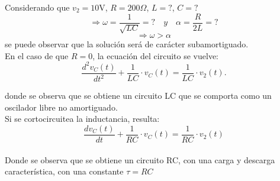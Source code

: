 \documentclass[a4paper]{article}
\begin{document}
Considerando que $v_2 = 10\textrm{V}$, $R = 200\Omega$, $L = ?$, $C = ?$ \[\Rightarrow \omega=\frac{1}{\sqrt{LC}}= ?\quad y \quad \alpha=\frac{R}{2L}= ?\] \[\Rightarrow \omega > \alpha\] se puede observar que la solución será de carácter subamortiguado.\\

En el caso de que $R=0$, la ecuación del circuito se vuelve:
\begin{equation}
\frac{d^{2}v_{C}(t)}{dt^{2}}+\frac{1}{LC}\cdot v_{C}(t)=\frac{1}{LC}\cdot v_{2}(t).
\end{equation}



donde se observa que se obtiene un circuito LC que se comporta como un oscilador libre no amortiguado.\\

Si se cortocircuitea la inductancia, resulta:
\begin{equation}
\frac{dv_{C}(t)}{dt}+\frac{1}{RC}\cdot v_{C}(t)=\frac{1}{RC}\cdot v_{2}(t)
\end{equation}\\
Donde se observa que se obtiene un circuito RC, con una carga y descarga característica, con una constante $\tau = RC$\\
\end{document}
